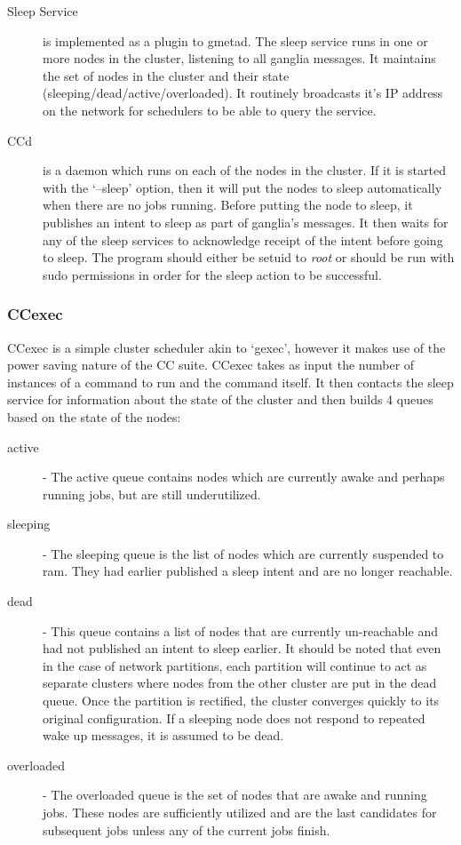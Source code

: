 \begin{description}
    \item[Sleep Service] is implemented as a plugin to gmetad. The sleep service runs in one or more nodes in the cluster, listening to all ganglia messages. It maintains the set of nodes in the cluster and their state (sleeping/dead/active/overloaded). It routinely broadcasts it's IP address on the network for schedulers to be able to query the service. 
    \item[CCd] is a daemon which runs on each of the nodes in the cluster. If it is started with the `--sleep' option, then it will put the nodes to sleep automatically when there are no jobs running. Before putting the node to sleep, it publishes an intent to sleep as part of ganglia's messages. It then waits for any of the sleep services to acknowledge receipt of the intent before going to sleep. The program should either be setuid to {\em root} or should be run with sudo permissions in order for the sleep action to be successful.
\end{description}

\subsubsection{CCexec} %
\label{ssub:ccexec}
CCexec is a simple cluster scheduler akin to `gexec', however it makes use of the power saving nature of the CC suite. CCexec takes as input the number of instances of a command to run and the command itself. It then contacts the sleep service for information about the state of the cluster and then builds 4 queues based on the state of the nodes:
\begin{description}
    \item[active] - The active queue contains nodes which are currently awake and perhaps running jobs, but are still underutilized. 
    \item[sleeping] - The sleeping queue is the list of nodes which are currently suspended to ram. They had earlier published a sleep intent and are no longer reachable.
    \item[dead] - This queue contains a list of nodes that are currently un-reachable and had not published an intent to sleep earlier. It should be noted that even in the case of network partitions, each partition will continue to act as separate clusters where nodes from the other cluster are put in the dead queue. Once the partition is rectified, the cluster converges quickly to its original configuration. If a sleeping node does not respond to repeated wake up messages, it is assumed to be dead. 
    \item[overloaded] - The overloaded queue is the set of nodes that are awake and running jobs. These nodes are sufficiently utilized and are the last candidates for subsequent jobs unless any of the current jobs finish.
\end{description}

